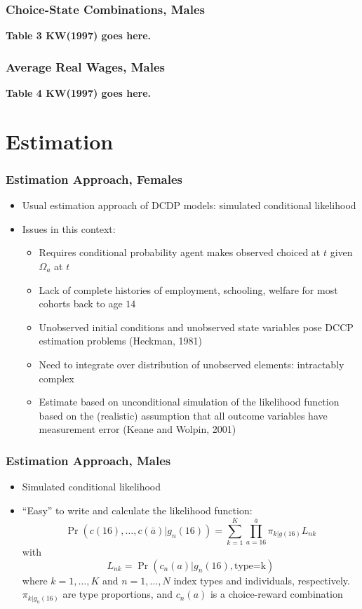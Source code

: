 \begin{frame}
	\frametitle{Choice-State Combinations, Males}
	\textbf{Table 3 KW(1997) goes here.}
\end{frame}

\begin{frame}
	\frametitle{Average Real Wages, Males}
	\textbf{Table 4 KW(1997) goes here.}
\end{frame}


\section{Estimation}

\begin{frame}
	\frametitle{Estimation Approach, Females}
		\begin{itemize}
			\item Usual estimation approach of DCDP models: simulated conditional likelihood
			\item Issues in this context:
				\begin{itemize}
					\item Requires conditional probability agent makes observed choiced at $t$ given $\Omega_{a}$ at $t$
					\item Lack of complete histories of employment, schooling, welfare for most cohorts back to age $14$
					\item Unobserved initial conditions and unobserved state variables pose DCCP estimation problems (Heckman, 1981)
					\item Need to integrate over distribution of unobserved elements: intractably complex
					\item Estimate based on unconditional simulation of the likelihood function based on the (realistic) assumption that all outcome variables have measurement error (Keane and Wolpin, 2001)
				\end{itemize}							
		\end{itemize}
\end{frame}

\begin{frame}
	\frametitle{Estimation Approach, Males}
		\begin{itemize}
			\item Simulated conditional likelihood
			\item ``Easy'' to write and calculate the likelihood function:
			\begin{equation}
				\Pr \left( c(16), \ldots, c(\bar{a})|g_{n}(16) \right) =
\sum \limits _{k=1} ^K \prod \limits _{a=16} ^{\bar{a}} \pi_{k|g(16)} L_{nk} \nonumber
			\end{equation}
\noindent with
\begin{equation}
L_{nk} = \Pr \left( c_{n}(a) | g_n(16), \text{type=k} \right)	\nonumber 
\end{equation}
\noindent where $k=1,\ldots,K$ and $n = 1, \ldots, N$ index types and individuals, respectively. $\pi_{k|g_{n}(16)}$ are type proportions, and $c_{n}(a)$ is a choice-reward combination
		\end{itemize}
\end{frame}


